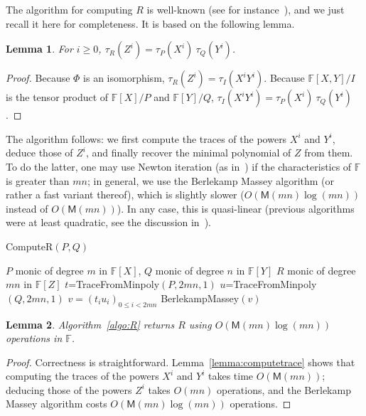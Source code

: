 \documentclass[12pt]{article}
\def\M {\ensuremath{\mathsf{M}}}
\def\F {\ensuremath{\mathbb{F}}}
\newtheorem{Lemma}{Lemma}
\begin{document}
The algorithm for computing $R$ is well-known (see for
instance~\cite{BoFlSaSc06}), and we just recall it here for
completeness. It is based on the following lemma.

\begin{Lemma}
  For $i \ge 0$, $\tau_R(Z^i) = \tau_P(X^i) \ \tau_Q(Y^i)$.
\end{Lemma}
\begin{proof}
  Because $\Phi$ is an isomorphism, $\tau_R(Z^i) = \tau_I(X^i
  Y^i)$. Because $\F[X,Y]/I$ is the tensor product of $\F[X]/P$ and
  $\F[Y]/Q$, $\tau_I(X^i Y^i)=\tau_P(X^i) \ \tau_Q(Y^i)$.
\end{proof}

The algorithm follows: we first compute the traces of the powers $X^i$
and $Y^i$, deduce those of $Z^i$, and finally recover the minimal
polynomial of $Z$ from them. To do the latter, one may use Newton
iteration (as in~\cite{Schoenhage82}) if the characteristics of $\F$
is greater than $mn$; in general, we use the Berlekamp Massey
algorithm (or rather a fast variant thereof), which is slightly slower
($O(\M(mn)\log(mn))$ instead of $O(\M(mn))$). In any case, 
this is quasi-linear (previous algorithms were at least quadratic,
see the discussion in~\cite{BoFlSaSc06}).

\begin{algorithm}[H]
  \caption{ComputeR$(P, Q)$}
  \begin{algorithmic}[1]
    \REQUIRE $P$ monic of degree $m$ in $\F[X]$, $Q$ monic of degree $n$ in $\F[Y]$
    \ENSURE $R$ monic of degree $mn$ in $\F[Z]$
    \STATE  $t$=TraceFromMinpoly$(P,2mn,1)$
    \STATE  $u$=TraceFromMinpoly$(Q,2mn,1)$
    \STATE $v=(t_i u_i)_{0 \le i < 2mn}$
    \RETURN BerlekampMassey$(v)$
  \end{algorithmic}
  \label{algo:R}
\end{algorithm}

\begin{Lemma}
  Algorithm~\ref{algo:R} returns $R$ using $O(\M(mn)\log(mn))$ operations in
  $\F$.
\end{Lemma}
\begin{proof}
  Correctness is straightforward.  Lemma~\ref{lemma:computetrace}
  shows that computing the traces of the powers $X^i$ and $Y^i$ takes
  time $O(\M(mn))$; deducing those of the powers $Z^i$ takes $O(mn)$
  operations, and the Berlekamp Massey algorithm costs
  $O(\M(mn)\log(mn))$ operations.
\end{proof}


\end{document}
